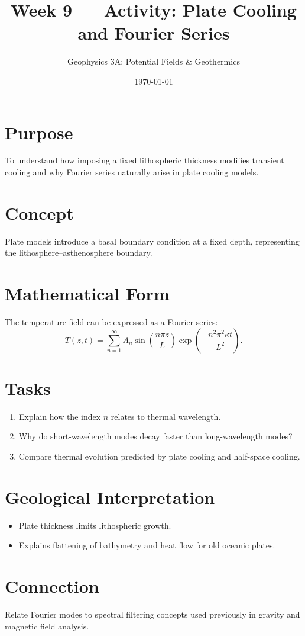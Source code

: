 \documentclass[11pt,a4paper]{article}
\title{Week 9 --- Activity: Plate Cooling and Fourier Series}
\author{Geophysics 3A: Potential Fields \& Geothermics}
\date{\today}
\begin{document}
\maketitle

\vspace{1em}

\section*{Purpose}
To understand how imposing a fixed lithospheric thickness modifies transient
cooling and why Fourier series naturally arise in plate cooling models.

\section*{Concept}
Plate models introduce a basal boundary condition at a fixed depth, representing
the lithosphere--asthenosphere boundary.

\section*{Mathematical Form}
The temperature field can be expressed as a Fourier series:
\[
T(z,t) = \sum_{n=1}^{\infty} A_n
\sin\!\left(\frac{n\pi z}{L}\right)
\exp\!\left(-\frac{n^2 \pi^2 \kappa t}{L^2}\right).
\]

\section*{Tasks}
\begin{enumerate}
  \item Explain how the index $n$ relates to thermal wavelength.
  \item Why do short-wavelength modes decay faster than long-wavelength modes?
  \item Compare thermal evolution predicted by plate cooling and half-space cooling.
\end{enumerate}

\section*{Geological Interpretation}
\begin{itemize}
  \item Plate thickness limits lithospheric growth.
  \item Explains flattening of bathymetry and heat flow for old oceanic plates.
\end{itemize}

\section*{Connection}
Relate Fourier modes to spectral filtering concepts used previously in gravity
and magnetic field analysis.
\end{document}
